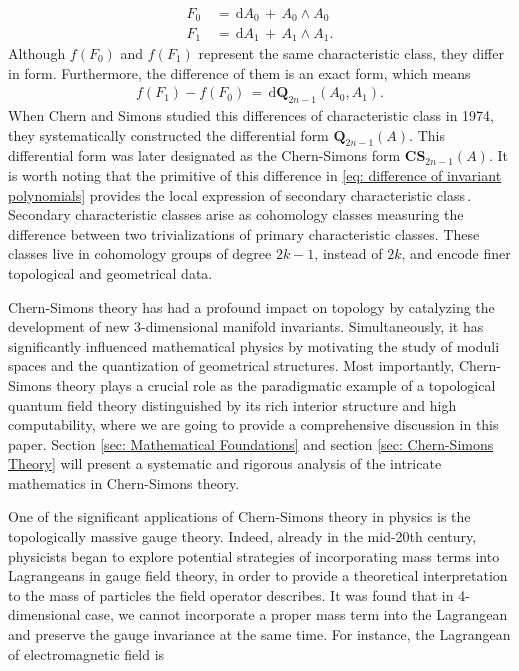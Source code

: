 \begin{equation}
    \begin{split}
        F_{0}\,&=\,\mathrm{d}A_{0}\,+\,A_{0}\wedge A_{0} \\
        F_{1}\,&=\,\mathrm{d}A_{1}\,+\,A_{1}\wedge A_{1}.
    \end{split}
\end{equation}
Although $f\left(F_{0}\right)$ and $f\left(F_{1}\right)$ represent the same characteristic class, they differ in form. Furthermore, the difference of them is an exact form, which means
\begin{equation}\label{eq: difference of invariant polynomials}
    \begin{split}
        f\left(F_{1}\right)-f\left(F_{0}\right)\,=\,\mathrm{d}\mathbf{Q}_{2n-1}\left(A_{0},A_{1}\right).
    \end{split}
\end{equation}
When Chern and Simons studied this differences of characteristic class in 1974, they systematically constructed the differential form $\mathbf{Q}_{2n-1}\left(A\right)$. This differential form was later designated as the Chern-Simons form $\mathbf{CS}_{2n-1}\left(A\right)$. It is worth noting that the primitive of this difference in \eqref{eq: difference of invariant polynomials} provides the local expression of secondary characteristic class\,\cite{chern1974characteristic}. Secondary characteristic classes arise as cohomology classes measuring the difference between two trivializations of primary characteristic classes. These classes live in cohomology groups of degree $2k-1$, instead of $2k$, and encode finer topological and geometrical data. 
\par Chern-Simons theory has had a profound impact on topology by catalyzing the development of new 3-dimensional manifold invariants. Simultaneously, it has significantly influenced mathematical physics by motivating the study of moduli spaces and the quantization of geometrical structures. Most importantly, Chern-Simons theory plays a crucial role as the paradigmatic example of a topological quantum field theory distinguished by its rich interior structure and high computability, where we are going to provide a comprehensive discussion in this paper. Section \ref{sec: Mathematical Foundations} and section \ref{sec: Chern-Simons Theory} will present a systematic and rigorous analysis of the intricate mathematics in Chern-Simons theory.
\par One of the significant applications of Chern-Simons theory in physics is the topologically massive gauge theory.  Indeed, already in the mid-20th century, physicists began to explore potential strategies of incorporating mass terms into Lagrangeans in gauge field theory, in order to provide a theoretical interpretation to the mass of particles the field operator describes. It was found that in 4-dimensional case, we cannot incorporate a proper mass term into the Lagrangean and preserve the gauge invariance at the same time. For instance, the Lagrangean of electromagnetic field is
